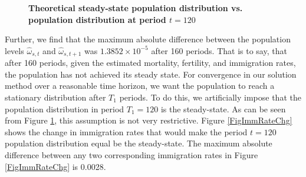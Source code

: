 \documentclass[letterpaper,12pt]{article}
\theoremstyle{definition}
\begin{document}
    \begin{figure}[htbp]\centering \captionsetup{width=4.0in}
      \caption{\label{FigOrigVsFixSSpop}\textbf{Theoretical steady-state population distribution vs. population distribution at period $t=120$}}
    \end{figure}

    Further, we find that the maximum absolute difference between the population levels $\hat{\omega}_{s,t}$ and $\hat{\omega}_{s,t+1}$ was $1.3852\times 10^{-5}$ after 160 periods. That is to say, that after 160 periods, given the estimated mortality, fertility, and immigration rates, the population has not achieved its steady state. For convergence in our solution method over a reasonable time horizon, we want the population to reach a stationary distribution after $T_1$ periods. To do this, we artificially impose that the population distribution in period $T_1=120$ is the steady-state. As can be seen from Figure \ref{FigOrigVsFixSSpop}, this assumption is not very restrictive. Figure \ref{FigImmRateChg} shows the change in immigration rates that would make the period $t=120$ population distribution equal be the steady-state. The maximum absolute difference between any two corresponding immigration rates in Figure \ref{FigImmRateChg} is 0.0028.
\end{document}
